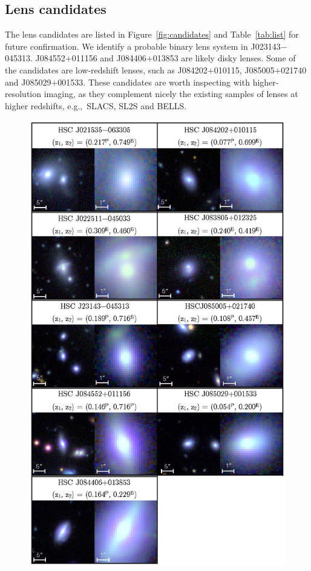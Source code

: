 \documentclass[apj]{emulateapj}
\newcommand{\fref}[1]{Figure~\ref{#1}}
\newcommand{\tref}[1]{Table~\ref{#1}}
\def\eg{{e.g.,}}
\begin{document}
\subsection{Lens candidates}   
\label{subsec:all_cand}



The lens candidates are listed in \fref{fig:candidates} and \tref{tab:list} for future confirmation. 
We identify a probable binary lens system in J023143$-$045313.
J084552$+$011156 and J084406$+$013853 are likely disky lenses.
Some of the candidates are low-redshift lenses, such as J084202$+$010115, J085005$+$021740 and J085029$+$001533.
These candidates are worth inspecting with higher-resolution 
imaging, 
as they complement nicely the existing samples of lenses at higher redshifts, \eg\ SLACS, SL2S and BELLS.

\begin{figure}
\centering
\includegraphics[scale=1.0]{figure/candidates.eps}

\end{figure}
\end{document}
